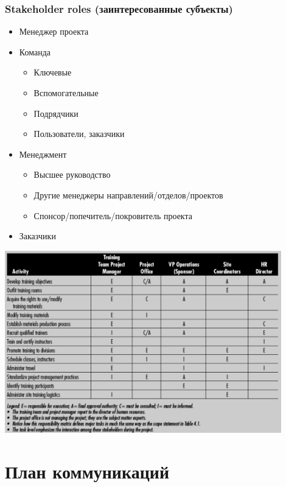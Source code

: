 \documentclass{../../slides-style}
\begin{document}
    \begin{frame}
        \frametitle{Stakeholder roles (заинтересованные субъекты)}
        \begin{itemize}
            \item Менеджер проекта
            \item Команда
            \begin{itemize}
                \item Ключевые
                \item Вспомогательные
                \item Подрядчики
                \item Пользователи, заказчики
            \end{itemize}
            \item Менеджмент
            \begin{itemize}
                \item Высшее руководство
                \item Другие менеджеры направлений/отделов/проектов
                \item Спонсор/попечитель/покровитель проекта
            \end{itemize}
            \item Заказчики
        \end{itemize}
    \end{frame}

    \begin{frame}
        \begin{center}
            \includegraphics[width=0.9\textwidth]{stakeholders.png}
        \end{center}
    \end{frame}

    \section{План коммуникаций}
\end{document}

